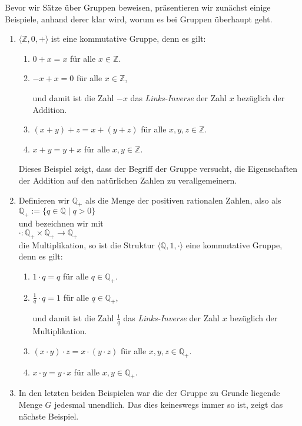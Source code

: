 \examples
Bevor wir Sätze über Gruppen beweisen, präsentieren wir zunächst einige Beispiele, anhand
derer klar wird, worum es bei Gruppen überhaupt geht.
\begin{enumerate}
\item $\langle \mathbb{Z}, 0, + \rangle$ ist eine kommutative Gruppe, denn es gilt:
      \begin{enumerate}
      \item $0 + x = x$ \quad für alle $x \in \mathbb{Z}$.
      \item $-x + x = 0$ \quad für alle $x \in \mathbb{Z}$,
        
            und damit ist die Zahl $-x$ das \emph{Links-Inverse} der Zahl $x$ bezüglich
            der Addition.
      \item $(x + y) + z = x + (y + z)$ \quad für alle $x,y,z \in \mathbb{Z}$.
      \item $x + y = y + x$ \quad für alle $x,y \in \mathbb{Z}$.
      \end{enumerate}
      Dieses Beispiel zeigt, dass der Begriff der Gruppe versucht, die Eigenschaften der
      Addition auf den natürlichen Zahlen zu verallgemeinern.
\item Definieren wir $\mathbb{Q}_+$ als die Menge der positiven rationalen Zahlen, also als
      \\[0.2cm]
      \hspace*{1.3cm}
      $\mathbb{Q}_+ := \{ q \in \mathbb{Q} \mid q > 0 \}$
      \\[0.2cm]
      und bezeichnen wir mit
      \\[0.2cm]
      \hspace*{1.3cm}
      $\cdot : \mathbb{Q}_+ \times \mathbb{Q}_+ \rightarrow \mathbb{Q}_+$
      \\[0.2cm]
      die Multiplikation, so ist die Struktur $\langle \mathbb{Q}, 1, \cdot \rangle$ eine
      kommutative Gruppe, denn es gilt: 
      \begin{enumerate}
      \item $1 \cdot q = q$ \quad für alle $q \in \mathbb{Q}_+$.
      \item $\frac{1}{q} \cdot q = 1$ \quad für alle $q \in \mathbb{Q}_+$,
        
            und damit ist die Zahl $\frac{1}{q}$ das \emph{Links-Inverse} der Zahl $x$ bezüglich der
            Multiplikation.
      \item $(x \cdot y) \cdot z = x \cdot (y \cdot z)$ \quad für alle $x,y,z \in \mathbb{Q}_+$.
      \item $x \cdot y = y \cdot x$ \quad für alle $x,y \in \mathbb{Q}_+$.
      \end{enumerate}
\item In den letzten beiden Beispielen war die der Gruppe zu Grunde liegende Menge $G$
      jedesmal unendlich.  Das dies keineswegs immer so ist, zeigt das nächste Beispiel.


\end{enumerate}
